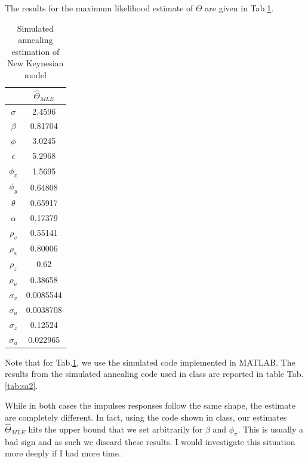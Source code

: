 \documentclass[12pt]{article}
\theoremstyle{definition}
\begin{document}
The results for the maximum likelihood estimate of $\Theta$ are given in Tab.\ref{tab:sa}.
\begin{table}[H]
	\centering
\begin{tabular}{c|c}
	\hline
	& $\hat{\Theta}_{MLE}$\\
	\hline 
	$\sigma $   &  2.4596\\
	$\beta$     & 0.81704\\
	$\phi  $   &   3.0245\\
	$\epsilon$     &  5.2968\\
	$\phi_\pi $ &  1.5695\\
	$\phi_y $  & 0.64808\\
	$\theta $ &   0.65917\\
	$\alpha $  &  0.17379\\
	$\rho_v$   &  0.55141\\
	$\rho_a$  &   0.80006\\
	$\rho_z$  &   0.62\\
	$\rho_u$  &    0.38658\\
	$\sigma_v$&  0.0085544\\
	$\sigma_a$ &0.0038708\\
	$\sigma_z$ & 0.12524\\
	$\sigma_u$& 0.022965\\
	\hline 
\end{tabular}
	\caption{Simulated annealing estimation of New Keynesian model}
\label{tab:sa}
\end{table}


Note that for Tab.\ref{tab:sa}, we use the simulated code implemented in MATLAB. The results from the simulated annealing code used in class are reported in table Tab.\ref{tab:sa2}. 

While in both cases the impulses responses follow the same shape, the estimate are completely different. In fact, using the code shown in class, our estimates $\hat{\Theta}_{MLE}$ hits the upper bound that we set arbitrarily for $\beta $ and $\phi_\pi$. This is usually a bad sign and as such we discard these results. I would investigate this situation more deeply if I had more time.
\end{document}

